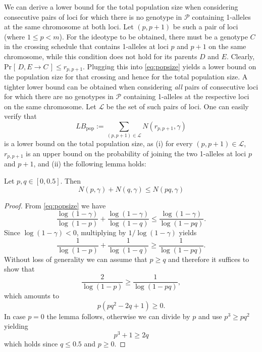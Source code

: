 \documentclass[runningheads]{llncs}
\renewcommand{\Pr}[2][]{\mathrm{Pr}_{#1} [\, #2 \, ]}
\begin{document}

We can derive a lower bound for the total population size when considering consecutive pairs of loci for which there is no genotype in $\mathcal{P}$ containing 1-alleles at the same chromosome at both loci.
Let $(p,p+1)$ be such a pair of loci (where $1 \leq p < m$). For the ideotype to be obtained, there must be a genotype $C$ in the crossing schedule that contains 1-alleles at loci $p$ and $p+1$ on the same 
chromosome, while this condition does not hold for its parents $D$ and $E$. Clearly, $\Pr{D,E \rightarrow C} \leq r_{p,p+1}$. Plugging this into \eqref{eq:popsize} yields a lower bound on the population size
for that crossing and hence for the total population size. A tighter lower bound can be obtained when considering \emph{all} pairs of consecutive loci for which there are no genotypes in $\mathcal{P}$ containing
1-alleles at the respective loci on the same chromosome. Let $\mathcal{L}$ be the set of such pairs of loci. One can easily verify that
\begin{equation}
\mathit{LB}_\mathrm{pop} := \sum_{(p,p+1) \in \mathcal{L}} N(r_{p,p+1},\gamma)
\end{equation}
is a lower bound on the total population size, as (i) for every $(p,p+1) \in \mathcal{L}$, $r_{p,p+1}$ is an upper bound on the probability of joining the two 1-alleles at loci $p$ and $p+1$, and (ii) 
the following lemma holds:
\begin{lemma}
\label{lem:pop_magic}
Let $p, q \in [0,0.5]$. Then
\[
N(p,\gamma) + N(q,\gamma) \leq N(p q,\gamma)
\]
\end{lemma}
\begin{proof}
From \eqref{eq:popsize} we have
\[
\frac{\log(1-\gamma)}{\log(1-p)} + \frac{\log(1-\gamma)}{\log(1-q)} \leq \frac{\log(1-\gamma)}{\log(1-p q)}.
\]
Since $\log(1-\gamma) < 0$, multiplying by $1/\log(1-\gamma)$ yields
\[
\frac{1}{\log(1-p)} + \frac{1}{\log(1-q)} \geq \frac{1}{\log(1-p q)}.
\]
Without loss of generality we can assume that $p \geq q$ and therefore it suffices to show that
\[
\frac{2}{\log(1-p)} \geq \frac{1}{\log(1-p q)},
\]
which amounts to
\[
p(p q^2 - 2 q + 1) \geq 0.
\]
In case $p = 0$ the lemma follows, otherwise we can divide by $p$ and use $p^3 \geq p q^2$ yielding
\[
p^3 + 1 \geq 2q
\]
which holds since $q \leq 0.5$ and $p \geq 0$. 
\end{proof}
\end{document}
